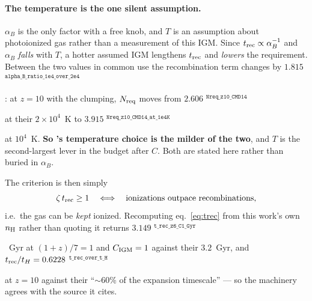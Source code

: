 \documentclass[11pt,a4paper]{article}
\newif\ifprovdraft
\newcommand{\src}[1]{%
  \ifprovdraft
    \ifmmode{}^{\text{\color{gray}\scriptsize\texttt{#1}}}%
    \else{\color{gray}\scriptsize$^{\texttt{#1}}$}%
    \fi
  \fi}
\begin{document}
\paragraph{The temperature is the one silent assumption.}
$\alpha_B$ is the only factor with a free knob, and $T$ is an assumption about
photoionized gas rather than a measurement of this IGM. Since
$t_{\rm rec}\propto\alpha_B^{-1}$ and $\alpha_B$ \emph{falls} with $T$, a hotter
assumed IGM lengthens $t_{\rm rec}$ and \emph{lowers} the requirement. Between
the two values in common use the recombination term changes by
$1.815$\src{alpha\_B\_ratio\_1e4\_over\_2e4}: at $z=10$ with the
\cite{md14} clumping, $N_{\rm req}$ moves from
$2.606$\src{Nreq\_z10\_CMD14} at their $2\times10^4$~K to
$3.915$\src{Nreq\_z10\_CMD14\_at\_1e4K} at $10^4$~K. \textbf{So \cite{md14}'s
temperature choice is the milder of the two}, and $T$ is the second-largest
lever in the budget after $C$. Both are stated here rather than buried in
$\alpha_B$.

The criterion is then simply
\[
  \zeta\,t_{\rm rec} \ge 1
  \quad\Longleftrightarrow\quad
  \text{ionizations outpace recombinations,}
\]
i.e.\ the gas can be \emph{kept} ionized. Recomputing eq.~\eqref{eq:trec} from
this work's own $n_{\rm H}$ rather than quoting it returns
$3.149$\src{t\_rec\_z6\_C1\_Gyr}~Gyr at $(1+z)/7 = 1$ and $C_{\rm IGM}=1$
against their $3.2$~Gyr, and $t_{\rm rec}/t_H =
0.6228$\src{t\_rec\_over\_t\_H} at $z=10$ against their ``$\sim$60\% of the
expansion timescale'' --- so the machinery agrees with the source it cites.
\end{document}
